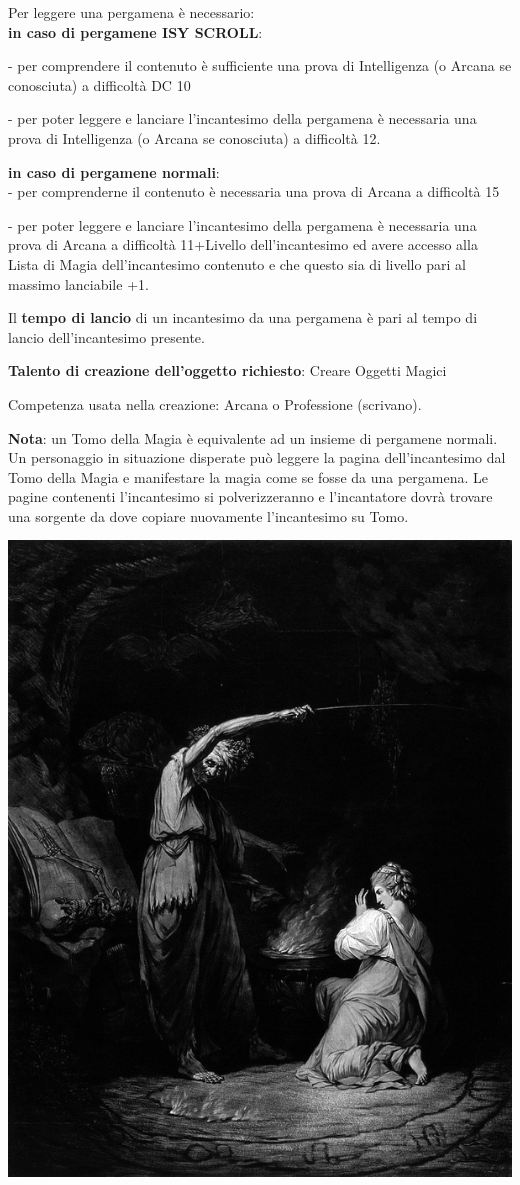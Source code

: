 \begin{multicols}{2}
	\medskip

	Per leggere una pergamena è necessario:\\

	\textbf{in caso di pergamene ISY SCROLL}:

	- per comprendere il contenuto è sufficiente una prova di Intelligenza (o Arcana se conosciuta) a difficoltà DC 10

	- per poter leggere e lanciare l'incantesimo della pergamena è necessaria una prova di Intelligenza (o Arcana se conosciuta) a difficoltà 12.\\

	\medskip

	\textbf{in caso di pergamene normali}:\\

	- per comprenderne il contenuto è necessaria una prova di Arcana a difficoltà 15

	- per poter leggere e lanciare l'incantesimo della pergamena è necessaria una prova di Arcana a difficoltà 11+Livello dell'incantesimo ed avere accesso alla Lista di Magia dell'incantesimo contenuto e che questo sia di livello pari al massimo lanciabile +1.

	\medskip

	Il \textbf{tempo di lancio} di un incantesimo da una pergamena è pari al tempo di lancio dell'incantesimo presente.

	\textbf{Talento di creazione dell'oggetto richiesto}: Creare Oggetti Magici

	Competenza usata nella creazione: Arcana o Professione (scrivano).

	\textbf{Nota}: un Tomo della Magia è equivalente ad un insieme di pergamene normali. Un personaggio in situazione disperate può leggere la pagina dell'incantesimo dal Tomo della Magia e manifestare la magia come se fosse da una pergamena. Le pagine contenenti l'incantesimo si polverizzeranno e l'incantatore dovrà trovare una sorgente da dove copiare nuovamente l'incantesimo su Tomo.

	\begin{center}
		\includegraphics[width=0.6\linewidth]{immagini/potion2.png}


\end{center}
\end{multicols}

